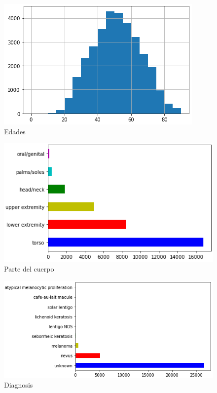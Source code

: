 \begin{figure}[htbp]
    \centering
    \textbf{}\par\medskip
    \includegraphics[scale=0.65]{3/figures/metadata/age_count.PNG}
    \caption{Edades}
    \label{age_count}
\end{figure}

\begin{figure}[htbp]
    \centering
    \textbf{}\par\medskip
    \includegraphics[scale=0.65]{3/figures/metadata/anatom_site_general_count.PNG}
    \caption{Parte del cuerpo}
    \label{anatom_site_general_count}
\end{figure}

\begin{figure}[htbp]
    \centering
    \textbf{}\par\medskip
    \includegraphics[scale=0.65]{3/figures/metadata/diagnosis_count.PNG}
    \caption{Diagnosis}
    \label{diagnosis_count}
\end{figure}

